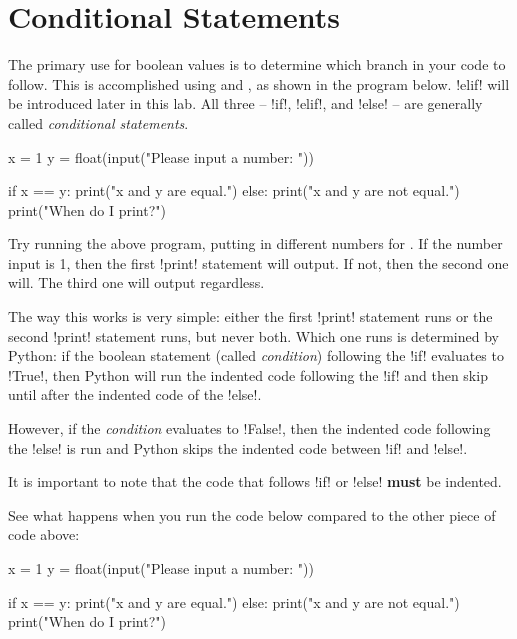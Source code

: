 \documentclass[11pt]{cselabheader}
\begin{document}
\pagebreak
\section{Conditional Statements}

The primary use for boolean values is to determine which branch in your code to
follow. This is accomplished using  and , as
shown in the program below. \pythoninline!elif! will be introduced later in this
lab. All three -- \pythoninline!if!, \pythoninline!elif!, and
\pythoninline!else! -- are generally called \emph{conditional statements}.

\begin{python3code}
x = 1
y = float(input("Please input a number: "))

if x == y:
    print("x and y are equal.")
else:
    print("x and y are not equal.")
print("When do I print?")
\end{python3code}

Try running the above program, putting in different numbers for
.  If the number input is 1, then the first \pythoninline!print!
statement will output. If not, then the second one will. The third one will
output regardless.

The way this works is very simple: either the first \pythoninline!print!
statement runs or the second \pythoninline!print! statement runs, but never
both. Which one runs is determined by Python: if the boolean statement (called
\emph{condition}) following the \pythoninline!if! evaluates to
\pythoninline!True!, then Python will run the indented code following the
\pythoninline!if! and then skip until after the indented code of the
\pythoninline!else!.

However, if the \emph{condition} evaluates to \pythoninline!False!, then the
indented code following the \pythoninline!else! is run and Python skips the
indented code between \pythoninline!if! and \pythoninline!else!.

It is important to note that the code that follows \pythoninline!if! or
\pythoninline!else! \textbf{must} be indented.

See what happens when you run the code below compared to the other piece of code
above:

\begin{python3code}
x = 1
y = float(input("Please input a number: "))

if x == y:
    print("x and y are equal.")
else:
    print("x and y are not equal.")
    print("When do I print?")
\end{python3code}
\end{document}
